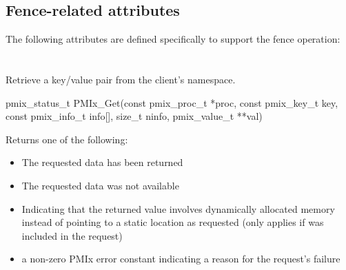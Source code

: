 \subsection{Fence-related attributes}

The following attributes are defined specifically to support the fence operation:

%


\section{}

\summary

Retrieve a key/value pair from the client's namespace.

\format

\cspecificstart
\begin{codepar}
pmix_status_t
PMIx_Get(const pmix_proc_t *proc, const pmix_key_t key,
         const pmix_info_t info[], size_t ninfo,
         pmix_value_t **val)
\end{codepar}
\cspecificend

\begin{arglist}
\end{arglist}

Returns one of the following:

\begin{itemize}
\item {} The requested data has been returned
\item {} The requested data was not available
\item {} Indicating that the returned value
involves dynamically allocated memory instead of pointing to a static location
as requested (only applies if  was included in the request)
\item a non-zero \ac{PMIx} error constant indicating a reason for the request's failure
\end{itemize}

